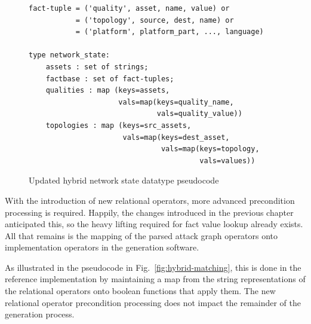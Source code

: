 \begin{figure}
\begin{lstlisting}
fact-tuple = ('quality', asset, name, value) or
           = ('topology', source, dest, name) or
           = ('platform', platform_part, ..., language)

type network_state:
    assets : set of strings;
    factbase : set of fact-tuples;
    qualities : map (keys=assets, 
                     vals=map(keys=quality_name,
                              vals=quality_value))
    topologies : map (keys=src_assets, 
                      vals=map(keys=dest_asset,
                               vals=map(keys=topology,
                                        vals=values))
\end{lstlisting}
\caption{Updated hybrid network state datatype pseudocode}
\label{fig:netstate_map_hybrid_pc}
\end{figure}
With the introduction of new relational operators, more advanced
precondition processing is required. Happily, the changes introduced
in the previous chapter anticipated this, so the heavy lifting required for
fact value lookup already exists. All that remains is the mapping of the
parsed attack graph operators onto implementation operators in the generation
software.

As illustrated in the pseudocode in Fig.~\ref{fig:hybrid-matching}, this is
done in the reference implementation by maintaining a map from the string
representations of the relational operators onto boolean functions that apply
them. The new relational operator precondition processing does not impact the
remainder of the generation process.

